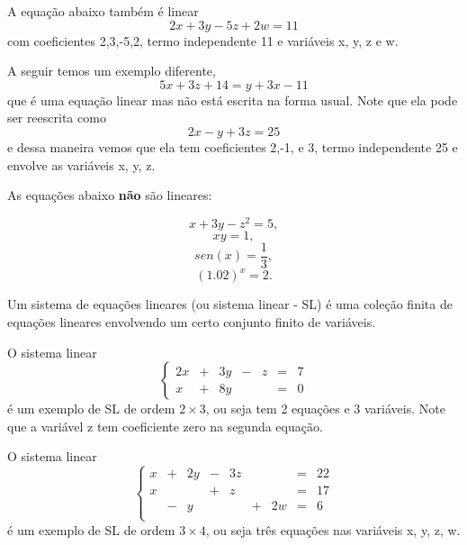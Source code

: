 \begin{ex}
A equação abaixo também é linear
\[
2x+3y-5z+2w=11
\]
com coeficientes 2,3,-5,2, termo independente 11 e variáveis x, y, z e w.
\end{ex}

\begin{ex}
A seguir temos um exemplo diferente,
\[
5x+3z+14=y+3x-11
\] que é uma equação linear mas não está escrita na forma usual. Note que ela pode ser reescrita como
\[
2x-y+3z=25
\]
e dessa maneira vemos que ela tem coeficientes 2,-1, e 3,  termo independente 25 e envolve as variáveis x, y, z.
\end{ex}

\begin{ex} As equações abaixo {\bf não} são lineares:

\[x+3y-z^2=5,\]
\[xy = 1,\]
\[sen(x)=\frac{1}{3}, \]
\[(1.02)^x=2.\]
\end{ex}

\begin{defn} Um sistema de equações lineares (ou sistema linear - SL) é uma coleção finita de equações lineares envolvendo um certo conjunto finito de  variáveis.
\end{defn}

\begin{ex}
O sistema linear
\begin{equation*}
\left\{
\begin{array}{ccccccc}
2x&+&3y&-&z&=&7 \\
x&+&8y& & &=&0
\end{array}
\right.
\end{equation*}
é um exemplo de SL de ordem $2 \times 3$, ou seja tem 2 equações e 3 variáveis. Note que a variável z tem coeficiente zero na segunda equação.
\end{ex}


\begin{ex}
O sistema linear
\begin{equation*}
\left\{
\begin{array}{ccccccccc}
x&+&2y&-&3z& & &=&22 \\
x& &  &+&z & & &=&17 \\
&-&y & &  &+&2w&=&6 \\
\end{array}
\right.
\end{equation*}
é um exemplo de SL de ordem $3 \times 4$, ou seja três equações nas variáveis x, y, z, w.
\end{ex}


